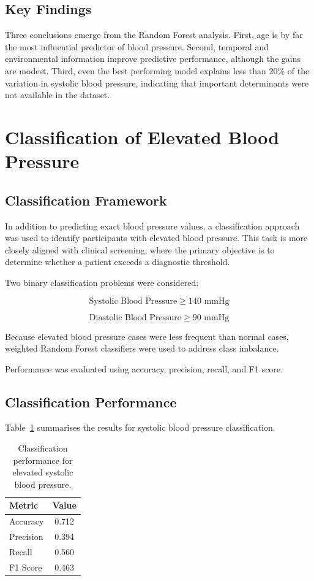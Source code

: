 \documentclass[12pt,a4paper]{article}
\begin{document}
\subsection{Key Findings}

Three conclusions emerge from the Random Forest analysis. First, age is by far the most influential predictor of blood pressure. Second, temporal and environmental information improve predictive performance, although the gains are modest. Third, even the best performing model explains less than 20\% of the variation in systolic blood pressure, indicating that important determinants were not available in the dataset.
\section{Classification of Elevated Blood Pressure}

\subsection{Classification Framework}

In addition to predicting exact blood pressure values, a classification approach was used to identify participants with elevated blood pressure. This task is more closely aligned with clinical screening, where the primary objective is to determine whether a patient exceeds a diagnostic threshold.

Two binary classification problems were considered:

\[
\text{Systolic Blood Pressure} \geq 140 \text{ mmHg}
\]

\[
\text{Diastolic Blood Pressure} \geq 90 \text{ mmHg}
\]

Because elevated blood pressure cases were less frequent than normal cases, weighted Random Forest classifiers were used to address class imbalance.

Performance was evaluated using accuracy, precision, recall, and F1 score.

\subsection{Classification Performance}

Table~\ref{tab:classification_sys} summarises the results for systolic blood pressure classification.

\begin{table}[H]
\centering
\caption{Classification performance for elevated systolic blood pressure.}
\label{tab:classification_sys}
\begin{tabular}{lc}
\toprule
Metric & Value \\
\midrule
Accuracy & 0.712 \\
Precision & 0.394 \\
Recall & 0.560 \\
F1 Score & 0.463 \\
\bottomrule
\end{tabular}
\end{table}
\end{document}
